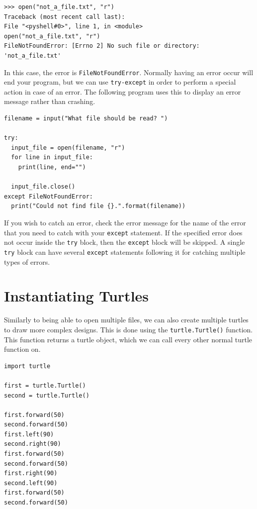 \documentclass[11pt]{cselabheader}
\begin{document}
\begin{lstlisting}[style=ipython]
>>> open("not_a_file.txt", "r")
Traceback (most recent call last):
File "<pyshell#0>", line 1, in <module>
open("not_a_file.txt", "r")
FileNotFoundError: [Errno 2] No such file or directory: 'not_a_file.txt'
\end{lstlisting}

In this case, the error is \lstinline{FileNotFoundError}. Normally having an
error occur will end your program, but we can use \lstinline{try-except} in
order to perform a special action in case of an error. The following program
uses this to display an error message rather than crashing.

\begin{lstlisting}[style=python]
filename = input("What file should be read? ")

try:
  input_file = open(filename, "r")
  for line in input_file:
    print(line, end="")

  input_file.close()
except FileNotFoundError:
  print("Could not find file {}.".format(filename))
\end{lstlisting}

If you wish to catch an error, check the error message for the name of the error
that you need to catch with your \lstinline{except} statement. If the specified
error does not occur inside the \lstinline{try} block, then the
\lstinline{except} block will be skipped. A single \lstinline{try} block can
have several \lstinline{except} statements following it for catching multiple
types of errors.

\pagebreak
\section{Instantiating Turtles}
Similarly to being able to open multiple files, we can also create multiple
turtles to draw more complex designs. This is done using the
\lstinline{turtle.Turtle()} function. This function returns a turtle object,
which we can call every other normal turtle function on.

\begin{lstlisting}[style=python]
import turtle

first = turtle.Turtle()
second = turtle.Turtle()

first.forward(50)
second.forward(50)
first.left(90)
second.right(90)
first.forward(50)
second.forward(50)
first.right(90)
second.left(90)
first.forward(50)
second.forward(50)
\end{lstlisting}
\end{document}

